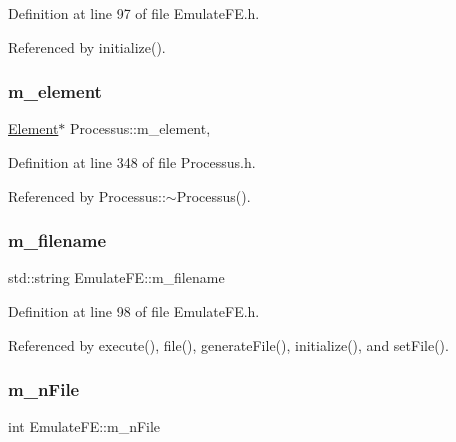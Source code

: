 Definition at line 97 of file Emulate\+F\+E.\+h.



Referenced by initialize().

\mbox{\label{classProcessus_aa9d24d53c3e52f36786cabb5d8e296e7}} 
\subsubsection{\texorpdfstring{m\+\_\+element}{m\_element}}
{\footnotesize\ttfamily \hyperlink{classElement}{Element}$\ast$ Processus\+::m\+\_\+element\hspace{0.3cm}{\ttfamily [protected]}, {\ttfamily [inherited]}}



Definition at line 348 of file Processus.\+h.



Referenced by Processus\+::$\sim$\+Processus().

\mbox{\label{classEmulateFE_a103fedea9eb5d3963573f9120cb81a68}} 
\subsubsection{\texorpdfstring{m\+\_\+filename}{m\_filename}}
{\footnotesize\ttfamily std\+::string Emulate\+F\+E\+::m\+\_\+filename\hspace{0.3cm}{\ttfamily [private]}}



Definition at line 98 of file Emulate\+F\+E.\+h.



Referenced by execute(), file(), generate\+File(), initialize(), and set\+File().

\mbox{\label{classEmulateFE_a04ed956f5992c36590dd5a6abc19de2c}} 
\subsubsection{\texorpdfstring{m\+\_\+n\+File}{m\_nFile}}
{\footnotesize\ttfamily int Emulate\+F\+E\+::m\+\_\+n\+File\hspace{0.3cm}{\ttfamily [private]}}



